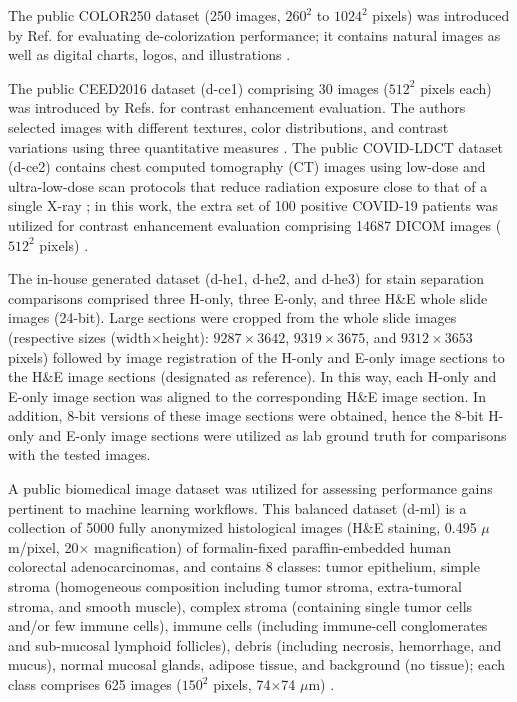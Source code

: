 \documentclass[superscriptaddress,longbibliography,aps,prl,twocolumn,10pt]{revtex4-2}
\begin{document}
The public COLOR250 dataset (250 images, $260^2$ to $1024^2$ pixels) was introduced by Ref. \cite{Lu2014} for evaluating de-colorization performance; it contains natural images as well as digital charts, logos, and illustrations \cite{Lu2014}. 

The public CEED2016 dataset (d-ce1) comprising 30 images ($512^2$ pixels each) was introduced by Refs. \cite{Qureshi2016, Qureshi2017} for contrast enhancement evaluation. The authors selected images with different textures, color distributions, and contrast variations using three quantitative measures \cite{Qureshi2017}. The public COVID-LDCT dataset (d-ce2) contains chest computed tomography (CT) images using low-dose and ultra-low-dose scan protocols that reduce radiation exposure close to that of a single X-ray \cite{Afshar2021}; in this work, the extra set of 100 positive COVID-19 patients was utilized for contrast enhancement evaluation comprising 14687 DICOM images ($512^2$ pixels) \cite{Afshar2021}.

The in-house generated dataset (d-he1, d-he2, and d-he3) for stain separation comparisons comprised three H-only, three E-only, and three H\&E whole slide images (24-bit). Large sections were cropped from the whole slide images (respective sizes (width$\times$height): $9287\times3642$, $9319\times3675$, and $9312\times3653$ pixels) followed by image registration of the H-only and E-only image sections to the H\&E image sections (designated as reference). In this way, each H-only and E-only image section was aligned to the corresponding H\&E image section. In addition, 8-bit versions of these image sections were obtained, hence the 8-bit H-only and E-only image sections were utilized as lab ground truth for comparisons with the tested images.

A public biomedical image dataset was utilized for assessing performance gains pertinent to machine learning workflows. This balanced dataset (d-ml) is a collection of 5000 fully anonymized histological images (H\&E staining, 0.495 $\mu$m/pixel, 20$\times$ magnification) of formalin-fixed paraffin-embedded human colorectal adenocarcinomas, and contains 8 classes:  tumor epithelium, simple stroma (homogeneous composition including tumor stroma, extra-tumoral stroma, and smooth muscle), complex stroma (containing single tumor cells and/or few immune cells), immune cells (including immune-cell conglomerates and sub-mucosal lymphoid follicles), debris (including necrosis, hemorrhage, and mucus), normal mucosal glands, adipose tissue, and background (no tissue); each class comprises 625 images ($150^2$ pixels, 74$\times$74 $\mu$m) \cite{Kather2016}.
\end{document}
